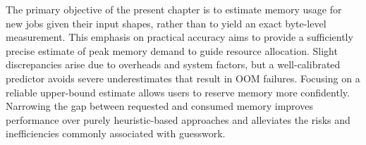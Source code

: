 The primary objective of the present chapter is to estimate memory usage for new jobs given their input shapes, rather than to yield an exact byte-level measurement.
This emphasis on practical accuracy aims to provide a sufficiently precise estimate of peak memory demand to guide resource allocation.
Slight discrepancies arise due to overheads and system factors, but a well-calibrated predictor avoids severe underestimates that result in \ac{OOM} failures.
Focusing on a reliable upper-bound estimate allows users to reserve memory more confidently.
Narrowing the gap between requested and consumed memory improves performance over purely heuristic-based approaches and alleviates the risks and inefficiencies commonly associated with guesswork.